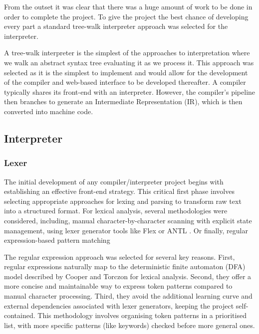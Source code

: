 \documentclass[final]{cmpreport_02}
\begin{document}
From the outset it was clear that there was a huge amount of work to be done in order to complete the project. To give the project the best chance of developing every part a standard tree-walk interpreter approach was selected for the interpreter.\newline

A tree-walk interpreter is the simplest of the approaches to interpretation where we walk an abstract syntax tree evaluating it as we process it. This approach was selected as it is the simplest to implement and would allow for the development of the compiler and web-based interface to be developed thereafter.
A compiler typically shares its front-end with an interpreter. However, the compiler's pipeline then branches to generate an Intermediate Representation (IR), which is then converted into machine code. 

\subsection{Interpreter}

\subsubsection{Lexer}
The initial development of any compiler/interpreter project begins with establishing an effective front-end strategy. This critical first phase involves selecting appropriate approaches for lexing and parsing to transform raw text into a structured format.
For lexical analysis, several methodologies were considered, including, manual character-by-character scanning with explicit state management, using lexer generator tools like Flex or ANTL \cite{parr2013definitive}. Or finally, regular expression-based pattern matching \newline

The regular expression approach was selected for several key reasons. First, regular expressions naturally map to the deterministic finite automaton (DFA) model described by Cooper and Torczon \cite{cooper2011engineering} for lexical analysis. Second, they offer a more concise and maintainable way to express token patterns compared to manual character processing. Third, they avoid the additional learning curve and external dependencies associated with lexer generators, keeping the project self-contained.
This methodology involves organising token patterns in a prioritised list, with more specific patterns (like keywords) checked before more general ones.\newline
\end{document}
